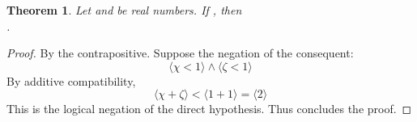 \documentclass[preview]{standalone}
\newtheorem{theorem}{Theorem}
\begin{document}
\begin{theorem} %
    Let \bm{$\chi$} and \bm{$\zeta$} be real numbers. 
    If , 
    then 
    \bm{$
        \big \langle \chi \ge 1 \big \rangle 
            \lor
    $}
    \\
    \bm{$
        \big \langle \zeta \ge 1 \big \rangle
    $}.
\end{theorem}

\begin{proof}
    By the contrapositive.
    Suppose the negation of the consequent: 
    \begin{equation*}
        \big \langle \chi < 1 \big \rangle 
            \land 
        \big \langle \zeta < 1 \big \rangle    
    \end{equation*}    
    By additive compatibility,
    \begin{equation*}
        \Big \langle \chi + \zeta \Big \rangle 
            < 
        \Big \langle 1 + 1 \Big \rangle 
            = 
        \Big \langle 
            2
        \Big \rangle
    \end{equation*}
    This is the logical negation of the direct hypothesis. Thus concludes the proof.
\end{proof}
\end{document}
